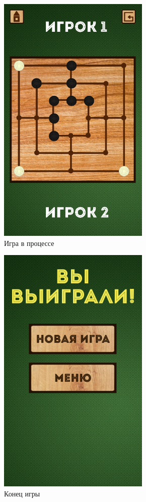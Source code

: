 \documentclass[a4paper]{article}
\begin{document}
\begin{figure}[H]
	\begin{center}
		\includegraphics[scale = 0.8]{screens/GameActivity_3.png}
		\caption{Игра в процессе} 
		\label{pic:pic_name} %
	\end{center}
\end{figure}

\begin{figure}[H]
	\begin{center}
		\includegraphics[scale = 0.8]{screens/EndGameActivity.png}
		\caption{Конец игры} 
		\label{pic:pic_name} %
	\end{center}
\end{figure}
\end{document}
